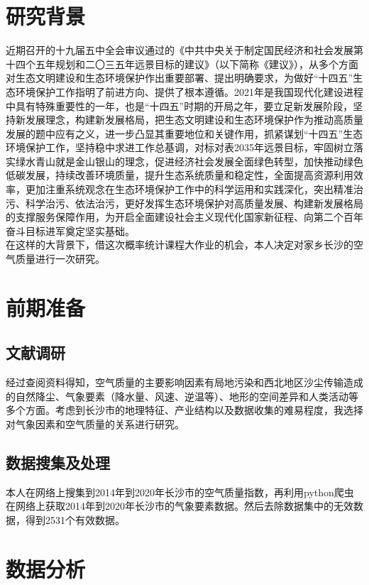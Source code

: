 \documentclass[UTF8,a4paper,10pt]{article}
\begin{document}
\section{研究背景}
\indent 近期召开的十九届五中全会审议通过的《中共中央关于制定国民经济和社会发展第十四个五年规划和二〇三五年远景目标的建议》（以下简称《建议》），从多个方面对生态文明建设和生态环境保护作出重要部署、提出明确要求，为做好“十四五”生态环境保护工作指明了前进方向、提供了根本遵循。2021年是我国现代化建设进程中具有特殊重要性的一年，也是“十四五”时期的开局之年，要立足新发展阶段，坚持新发展理念，构建新发展格局，把生态文明建设和生态环境保护作为推动高质量发展的题中应有之义，进一步凸显其重要地位和关键作用，抓紧谋划“十四五”生态环境保护工作，坚持稳中求进工作总基调，对标对表2035年远景目标，牢固树立落实绿水青山就是金山银山的理念，促进经济社会发展全面绿色转型，加快推动绿色低碳发展，持续改善环境质量，提升生态系统质量和稳定性，全面提高资源利用效率，更加注重系统观念在生态环境保护工作中的科学运用和实践深化，突出精准治污、科学治污、依法治污，更好发挥生态环境保护对高质量发展、构建新发展格局的支撑服务保障作用，为开启全面建设社会主义现代化国家新征程、向第二个百年奋斗目标进军奠定坚实基础。\supercite{ref1}\\
\indent 在这样的大背景下，借这次概率统计课程大作业的机会，本人决定对家乡长沙的空气质量进行一次研究。\\

\section{前期准备}

\subsection{文献调研}
\indent 经过查阅资料\supercite{ref2}得知，空气质量的主要影响因素有局地污染和西北地区沙尘传输造成的自然降尘、气象要素（降水量、风速、逆温等）、地形的空间差异和人类活动等多个方面。考虑到长沙市的地理特征、产业结构以及数据收集的难易程度，我选择对气象因素和空气质量的关系进行研究。 

\subsection{数据搜集及处理}
\indent 本人在网络\supercite{ref3}上搜集到2014年到2020年长沙市的空气质量指数，再利用python爬虫在网络\supercite{ref4}上获取2014年到2020年长沙市的气象要素数据。然后去除数据集中的无效数据，得到2531个有效数据。

\section{数据分析}
\end{document}
